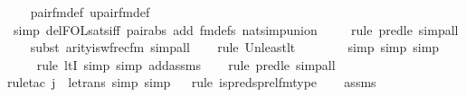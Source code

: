 \begin{isabellebody}
\ \ \isamarkupfalse%
\ pair{\isacharunderscore}{\kern0pt}fm{\isacharunderscore}{\kern0pt}def\ upair{\isacharunderscore}{\kern0pt}fm{\isacharunderscore}{\kern0pt}def\isanewline
\ \ \ \ \isamarkupfalse%
\ {\isacharparenleft}{\kern0pt}simp\ del{\isacharcolon}{\kern0pt}FOL{\isacharunderscore}{\kern0pt}sats{\isacharunderscore}{\kern0pt}iff\ pair{\isacharunderscore}{\kern0pt}abs\ add{\isacharcolon}{\kern0pt}\ fm{\isacharunderscore}{\kern0pt}defs\ nat{\isacharunderscore}{\kern0pt}simp{\isacharunderscore}{\kern0pt}union{\isacharparenright}{\kern0pt}\ \isanewline
\ \ \ \isamarkupfalse%
{\isacharparenleft}{\kern0pt}rule\ pred{\isacharunderscore}{\kern0pt}le{\isacharcomma}{\kern0pt}\ simp{\isacharunderscore}{\kern0pt}all{\isacharparenright}{\kern0pt}{\isacharplus}{\kern0pt}\isanewline
\ \ \ \isamarkupfalse%
{\isacharparenleft}{\kern0pt}subst\ arity{\isacharunderscore}{\kern0pt}is{\isacharunderscore}{\kern0pt}wfrec{\isacharunderscore}{\kern0pt}fm{\isacharcomma}{\kern0pt}\ simp{\isacharunderscore}{\kern0pt}all{\isacharparenright}{\kern0pt}\isanewline
\ \ \ \isamarkupfalse%
{\isacharparenleft}{\kern0pt}rule\ Un{\isacharunderscore}{\kern0pt}least{\isacharunderscore}{\kern0pt}lt{\isacharparenright}{\kern0pt}{\isacharplus}{\kern0pt}\isanewline
\ \ \ \ \ \ \isamarkupfalse%
\ {\isacharparenleft}{\kern0pt}simp{\isacharcomma}{\kern0pt}\ simp{\isacharcomma}{\kern0pt}\ simp{\isacharparenright}{\kern0pt}\isanewline
\ \ \ \ \isamarkupfalse%
{\isacharparenleft}{\kern0pt}rule\ ltI{\isacharcomma}{\kern0pt}\ simp{\isacharcomma}{\kern0pt}\ simp\ add{\isacharcolon}{\kern0pt}assms{\isacharparenright}{\kern0pt}\isanewline
\ \ \ \isamarkupfalse%
{\isacharparenleft}{\kern0pt}rule\ pred{\isacharunderscore}{\kern0pt}le{\isacharcomma}{\kern0pt}\ simp{\isacharunderscore}{\kern0pt}all{\isacharparenright}{\kern0pt}{\isacharplus}{\kern0pt}\isanewline
\ \ \isamarkupfalse%
{\isacharparenleft}{\kern0pt}rule{\isacharunderscore}{\kern0pt}tac\ j{\isacharequal}{\kern0pt}{}\ \ le{\isacharunderscore}{\kern0pt}trans{\isacharcomma}{\kern0pt}\ simp{\isacharcomma}{\kern0pt}\ simp{\isacharparenright}{\kern0pt}\isanewline
\ \ \isamarkupfalse%
{\isacharparenleft}{\kern0pt}rule\ is{\isacharunderscore}{\kern0pt}preds{\isacharunderscore}{\kern0pt}prel{\isacharunderscore}{\kern0pt}fm{\isacharunderscore}{\kern0pt}type{\isacharparenright}{\kern0pt}\isanewline
\ \ \isamarkupfalse%
\ assms\ \isanewline

\end{isabellebody}
